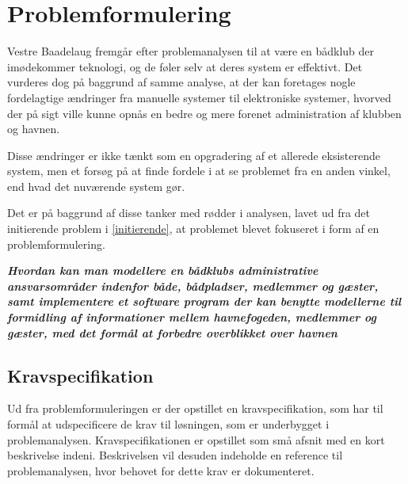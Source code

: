 \chapter{Problemformulering}
\label{cha:problemformulering}


Vestre Baadelaug fremgår efter problemanalysen til at være en bådklub der imødekommer teknologi, og de føler selv at deres system er effektivt. Det vurderes dog på baggrund af samme analyse, at der kan foretages nogle fordelagtige ændringer fra manuelle systemer til elektroniske systemer, hvorved der på sigt ville kunne opnås en bedre og mere forenet administration af klubben og havnen.

Disse ændringer er ikke tænkt som en opgradering af et allerede eksisterende system, men et forsøg på at finde fordele i at se problemet fra en anden vinkel, end hvad det nuværende system gør.

Det er på baggrund af disse tanker med rødder i analysen, lavet ud fra det initierende problem i \cref{initierende}, at problemet blevet fokuseret i form af en problemformulering. 

\begin{displayquote}
\textbf{\textit{Hvordan kan man modellere en bådklubs administrative ansvarsområder indenfor både, bådpladser, medlemmer og gæster, samt implementere et software program der kan benytte modellerne til formidling af informationer mellem havnefogeden, medlemmer og gæster, med det formål at forbedre overblikket over havnen}}
\end{displayquote}

\section{Kravspecifikation} %
\label{sec:Kravspecifikation}

Ud fra problemformuleringen er der opstillet en kravspecifikation, som har til formål at udspecificere de krav til løsningen, som er underbygget i problemanalysen. Kravspecifikationen er opstillet som små afsnit med en kort beskrivelse indeni. Beskrivelsen vil desuden indeholde en reference til problemanalysen, hvor behovet for dette krav er dokumenteret.
 



